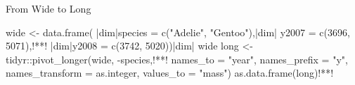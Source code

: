 \begin{frame}{From Wide to Long}
\begin{minipage}{.6\textwidth}
\footnotesize
\begin{rsession}
wide <- data.frame(
  |dim|species = c("Adelie", "Gentoo"),|dim|
  y2007 = c(3696, 5071),!**!
  |dim|y2008 = c(3742, 5020))|dim|
wide
long <- tidyr::pivot_longer(wide, -species,!**!
  names_to = "year", names_prefix = "y",
  names_transform = as.integer, values_to = "mass")
as.data.frame(long)!**!
\end{rsession}
\end{minipage}
\end{frame}

